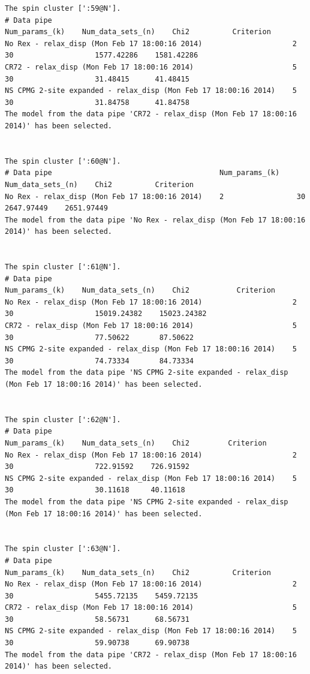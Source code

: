 \begin{lstlisting}[basicstyle=\ttfamily \tiny,language=relax_log,numbers=none]
The spin cluster [':59@N'].
# Data pipe                                                        Num_params_(k)    Num_data_sets_(n)    Chi2          Criterion     
No Rex - relax_disp (Mon Feb 17 18:00:16 2014)                     2                 30                   1577.42286    1581.42286    
CR72 - relax_disp (Mon Feb 17 18:00:16 2014)                       5                 30                   31.48415      41.48415      
NS CPMG 2-site expanded - relax_disp (Mon Feb 17 18:00:16 2014)    5                 30                   31.84758      41.84758      
The model from the data pipe 'CR72 - relax_disp (Mon Feb 17 18:00:16 2014)' has been selected.


The spin cluster [':60@N'].
# Data pipe                                       Num_params_(k)    Num_data_sets_(n)    Chi2          Criterion     
No Rex - relax_disp (Mon Feb 17 18:00:16 2014)    2                 30                   2647.97449    2651.97449    
The model from the data pipe 'No Rex - relax_disp (Mon Feb 17 18:00:16 2014)' has been selected.


The spin cluster [':61@N'].
# Data pipe                                                        Num_params_(k)    Num_data_sets_(n)    Chi2           Criterion      
No Rex - relax_disp (Mon Feb 17 18:00:16 2014)                     2                 30                   15019.24382    15023.24382    
CR72 - relax_disp (Mon Feb 17 18:00:16 2014)                       5                 30                   77.50622       87.50622       
NS CPMG 2-site expanded - relax_disp (Mon Feb 17 18:00:16 2014)    5                 30                   74.73334       84.73334       
The model from the data pipe 'NS CPMG 2-site expanded - relax_disp (Mon Feb 17 18:00:16 2014)' has been selected.


The spin cluster [':62@N'].
# Data pipe                                                        Num_params_(k)    Num_data_sets_(n)    Chi2         Criterion    
No Rex - relax_disp (Mon Feb 17 18:00:16 2014)                     2                 30                   722.91592    726.91592    
NS CPMG 2-site expanded - relax_disp (Mon Feb 17 18:00:16 2014)    5                 30                   30.11618     40.11618     
The model from the data pipe 'NS CPMG 2-site expanded - relax_disp (Mon Feb 17 18:00:16 2014)' has been selected.


The spin cluster [':63@N'].
# Data pipe                                                        Num_params_(k)    Num_data_sets_(n)    Chi2          Criterion     
No Rex - relax_disp (Mon Feb 17 18:00:16 2014)                     2                 30                   5455.72135    5459.72135    
CR72 - relax_disp (Mon Feb 17 18:00:16 2014)                       5                 30                   58.56731      68.56731      
NS CPMG 2-site expanded - relax_disp (Mon Feb 17 18:00:16 2014)    5                 30                   59.90738      69.90738      
The model from the data pipe 'CR72 - relax_disp (Mon Feb 17 18:00:16 2014)' has been selected.



\end{lstlisting}
